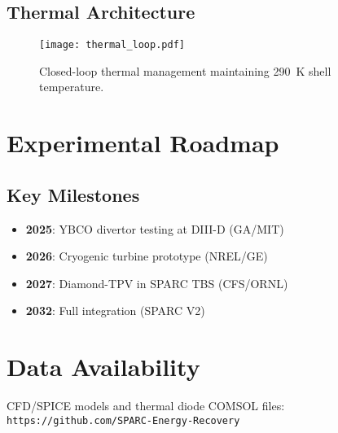 \documentclass{article}
\begin{document}
\subsection{Thermal Architecture}
\begin{figure}[ht]
    \centering
    \texttt{[image: thermal\_loop.pdf]}
    \caption{Closed-loop thermal management maintaining \SI{290}{K} shell temperature.}
    \label{fig:thermal}
\end{figure}

\section{Experimental Roadmap}
\label{sec:roadmap}

\subsection{Key Milestones}
\begin{itemize}
    \item \textbf{2025}: YBCO divertor testing at DIII-D (GA/MIT)
    \item \textbf{2026}: Cryogenic turbine prototype (NREL/GE)
    \item \textbf{2027}: Diamond-TPV in SPARC TBS (CFS/ORNL)
    \item \textbf{2032}: Full integration (SPARC V2)
\end{itemize}

\section*{Data Availability}
CFD/SPICE models and thermal diode COMSOL files:\\
\texttt{https://github.com/SPARC-Energy-Recovery}



\end{document}
